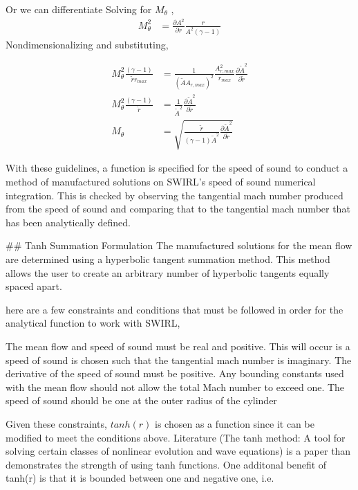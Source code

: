 Or we can differentiate
Solving for $M_{\theta}$ ,
\begin{align*}
M_{\theta}^2 
&= \frac{\partial A^2}{\partial r} \frac{r}{A^2 \left(\gamma - 1\right)}
\end{align*}
Nondimensionalizing and substituting, 

\begin{align} 
    M_{\theta}^2
    \frac{\left( \gamma - 1 \right)}{\widetilde{r} r_{max}} &=
    \frac{1}{(\widetilde{A}A_{r,max})^2}\frac{A_{r,max}^2}{r_{max}}
    \frac{\partial \widetilde{A}^2}{\partial \widetilde{r}} \nonumber \\
    M_{\theta}^2     \frac{\left( \gamma - 1 \right)}{\widetilde{r} } &=
    \frac{1}{\widetilde{A}^2}
    \frac{\partial \widetilde{A}^2}{\partial \widetilde{r}} \nonumber \\
    M_{\theta} &= \sqrt{\frac{\widetilde{r}}{(\gamma-1) \widetilde{A}^2}
        \frac{\partial\widetilde{A}^2}{\partial \widetilde{r} }
    } \label{eq:Mthetabackcalculated}
\end{align}


 With these guidelines, a function is specified for the speed of sound to conduct
 a method of manufactured solutions on SWIRL's speed of sound numerical 
 integration. This is checked by observing the tangential mach number 
 produced from the speed of sound and comparing that to the tangential mach number
 that has been analytically defined.
 
 ## Tanh Summation Formulation
The manufactured solutions for the mean flow are determined using a hyperbolic tangent summation method. This method allows the user to create an arbitrary number of hyperbolic tangents equally spaced apart. 

here are a few constraints and conditions that must be followed in order for the analytical 
function to work with SWIRL, 

The mean flow and speed of sound must be real and positive. This will occur is a speed of sound is chosen such that the tangential mach number is imaginary. The derivative of the speed of sound must be positive. Any bounding constants used with the mean flow should not allow the total Mach number to exceed one. The speed of sound should be one at the outer radius of the cylinder

Given these constraints, $tanh(r)$ is chosen as a function since it can be
modified to meet the conditions above. Literature (The tanh method: A tool for 
solving certain classes of nonlinear evolution and wave equations) 
is a paper than demonstrates the strength of using tanh functions.
One additonal benefit of tanh(r) is that it is bounded between one and negative one, i.e.


